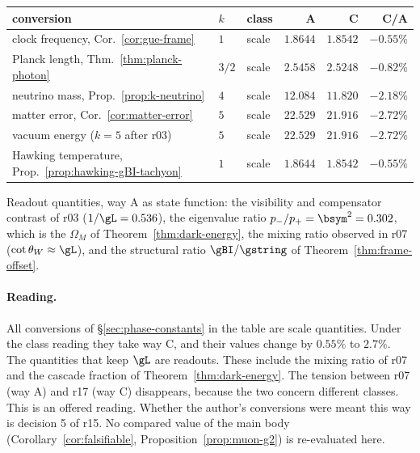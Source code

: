 \begin{center}
\small
\begin{tabular}{@{}>{\raggedright\arraybackslash}p{}>{\raggedright\arraybackslash}p{}>{\raggedright\arraybackslash}p{}rrr@{}}
\toprule
conversion & \(k\) & class & A & C & C/A\\
\midrule
clock frequency, Cor.~\ref{cor:gue-frame} & \(1\) & scale & \(1.8644\) & \(1.8542\) & \(-0.55\%\)\\
Planck length, Thm.~\ref{thm:planck-photon} & \(3/2\) & scale & \(2.5458\) & \(2.5248\) & \(-0.82\%\)\\
neutrino mass, Prop.~\ref{prop:k-neutrino} & \(4\) & scale & \(12.084\) & \(11.820\) & \(-2.18\%\)\\
matter error, Cor.~\ref{cor:matter-error} & \(5\) & scale & \(22.529\) & \(21.916\) & \(-2.72\%\)\\
vacuum energy (\(k=5\) after r03) & \(5\) & scale & \(22.529\) & \(21.916\) & \(-2.72\%\)\\
Hawking temperature, Prop.~\ref{prop:hawking-gBI-tachyon} & \(1\) & scale & \(1.8644\) & \(1.8542\) & \(-0.55\%\)\\
\bottomrule
\end{tabular}
\end{center}
Readout quantities, way A as state function: the visibility and compensator contrast of r03 (\(1/\gL=0.536\)), the eigenvalue
ratio \(p_-/p_+=\bsym^2=0.302\), which is the \(\Omega_M\) of Theorem~\ref{thm:dark-energy}, the mixing ratio observed in r07
(\(\cot\theta_W\approx\gL\)), and the structural ratio \(\gBI/\gstring\) of Theorem~\ref{thm:frame-offset}.

\paragraph{Reading.}
All conversions of \S\ref{sec:phase-constants} in the table are scale quantities.  Under the class reading they take way C,
and their values change by \(0.55\%\) to \(2.7\%\).  The quantities that keep \(\gL\) are readouts.  These include the mixing ratio
of r07 and the cascade fraction of Theorem~\ref{thm:dark-energy}.  The tension between r07 (way A) and r17 (way C) disappears,
because the two concern different classes.  This is an offered reading.  Whether the author's conversions were meant this way
is decision 5 of r15.  No compared value of the main body (Corollary~\ref{cor:falsifiable}, Proposition~\ref{prop:muon-g2}) is
re-evaluated here.

